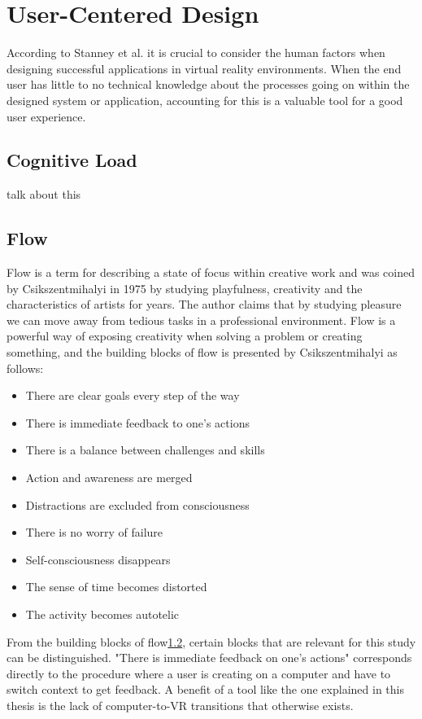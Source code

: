 \section{User-Centered Design}
\label{theory:user-centered}
According to Stanney et al. it is crucial to consider the human factors when designing successful applications in virtual reality environments. When the end user has little to no technical knowledge about the processes going on within the designed system or application, accounting for this is a valuable tool for a good user experience.
\cite{UCD:stanney1998human}
\subsection{Cognitive Load}
talk about this
\subsection{Flow}
\label{theory:user-centered:flow}
Flow is a term for describing a state of focus within creative work and was coined by Csikszentmihalyi in 1975 by studying playfulness, creativity and the characteristics of artists for years. \cite{UCD:boredom1975anxiety} The author claims that by studying pleasure we can move away from tedious tasks in a professional environment. Flow is a powerful way of exposing creativity when solving a problem or creating something, and the building blocks of flow is presented by Csikszentmihalyi as follows:\cite{UCD:csikszentmihalyi1996flow}

\begin{itemize}
  \item There are clear goals every step of the way
  \item There is immediate feedback to one's actions
  \item There is a balance between challenges and skills
  \item Action and awareness are merged
  \item Distractions are excluded from consciousness
  \item There is no worry of failure
  \item Self-consciousness disappears
  \item The sense of time becomes distorted
  \item The activity becomes autotelic
\end{itemize}

From the building blocks of flow\ref{theory:user-centered:flow}, certain blocks that are relevant for this study can be distinguished. "There is immediate feedback on one's actions" corresponds directly to the procedure where a user is creating on a computer and have to switch context to get feedback. A benefit of a tool like the one explained in this thesis is the lack of computer-to-VR transitions that otherwise exists.
